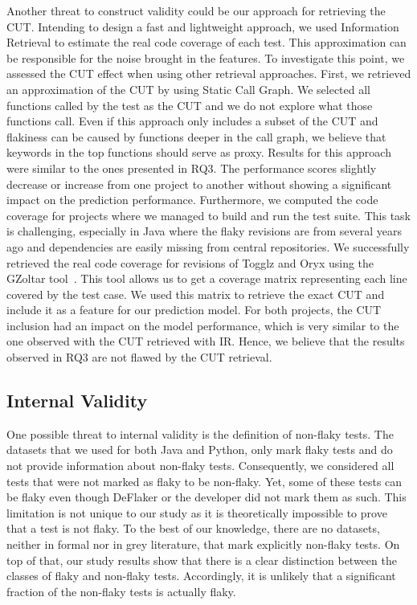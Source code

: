 Another threat to construct validity could be our approach for retrieving the CUT. 
Intending to design a fast and lightweight approach, we used Information Retrieval to estimate the real code coverage of each test. 
This approximation can be responsible for the noise brought in the features. 
To investigate this point, we assessed the CUT effect when using other retrieval approaches. 
First, we retrieved an approximation of the CUT by using Static Call Graph. 
We selected all functions called by the test as the CUT and we do not explore what those functions call. 
Even if this approach only includes a subset of the CUT and flakiness can be caused by functions deeper in the call graph, we believe that keywords in the top functions should serve as proxy.
Results for this approach were similar to the ones presented in \textsc{RQ3}.
The performance scores slightly decrease or increase from one project to another without showing a significant impact on the prediction performance. 
Furthermore, we computed the code coverage for projects where we managed to build and run the test suite.
This task is challenging, especially in Java where the flaky revisions are from several years ago and dependencies are easily missing from central repositories. 
We successfully retrieved the real code coverage for revisions of Togglz and Oryx using the GZoltar tool~\cite{GZoltarA61:online}.
This tool allows us to get a coverage matrix representing each line covered by the test case. 
We used this matrix to retrieve the exact CUT and include it as a feature for our prediction model.
For both projects, the CUT inclusion had an impact on the model performance, which is very similar to the one observed with the CUT retrieved with IR.
Hence, we believe that the results observed in \textsc{RQ3} are not flawed by the CUT retrieval. 

\subsection{Internal Validity}
One possible threat to internal validity is the definition of non-flaky tests.
The datasets that we used for both Java and Python, only mark flaky tests and do not provide information about non-flaky tests.
Consequently, we considered all tests that were not marked as flaky to be non-flaky.
Yet, some of these tests can be flaky even though DeFlaker or the developer did not mark them as such.
This limitation is not unique to our study as it is theoretically impossible to prove that a test is not flaky.
To the best of our knowledge, there are no datasets, neither in formal nor in grey literature, that mark explicitly non-flaky tests.
On top of that, our study results show that there is a clear distinction between the classes of flaky and non-flaky tests.
Accordingly, it is unlikely that a significant fraction of the non-flaky tests is actually flaky.

